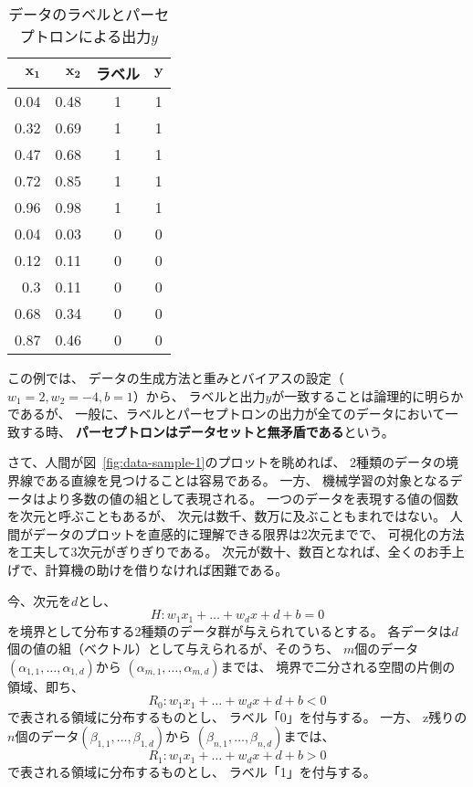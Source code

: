 \begin{table}[htb]
  \centering
  \caption{データのラベルとパーセプトロンによる出力$y$}
  \label{tab:prediction-by-perceptron}
  
  \begin{tabular}{rrcc}
    \toprule
    $\boldsymbol{x_1}$ & $\boldsymbol{x_2}$ & \bf ラベル & $\boldsymbol y$ \\\midrule
    0.04 & 0.48 & 1 & 1\\
    0.32 & 0.69 & 1 & 1\\
    0.47 & 0.68 & 1 & 1\\
    0.72 & 0.85 & 1 & 1\\
    0.96 & 0.98 & 1 & 1\\
    0.04 & 0.03 & 0 & 0\\
    0.12 & 0.11 & 0 & 0\\
    0.3 & 0.11 & 0 & 0\\
    0.68 & 0.34 & 0 & 0\\
    0.87 & 0.46 & 0 & 0\\
    \bottomrule
  \end{tabular}
\end{table}

この例では、
データの生成方法と重みとバイアスの設定（$w_1 = 2, w_2 = -4, b = 1$）から、
ラベルと出力$y$が一致することは論理的に明らかであるが、
一般に、ラベルとパーセプトロンの出力が全てのデータにおいて一致する時、
\textbf{パーセプトロンはデータセットと無矛盾である}という。

さて、人間が図~\ref{fig:data-sample-1}のプロットを眺めれば、
2種類のデータの境界線である直線を見つけることは容易である。
一方、
機械学習の対象となるデータはより多数の値の組として表現される。
一つのデータを表現する値の個数を次元と呼ぶこともあるが、
次元は数千、数万に及ぶこともまれではない。
人間がデータのプロットを直感的に理解できる限界は2次元までで、
可視化の方法を工夫して3次元がぎりぎりである。
次元が数十、数百となれば、全くのお手上げで、計算機の助けを借りなければ困難である。

今、次元を$d$とし、
\[
  H: w_1x_1 + \dots + w_dx+d + b = 0
\]
を境界として分布する2種類のデータ群が与えられているとする。
各データは$d$個の値の組（ベクトル）として与えられるが、そのうち、
$m$個のデータ$(\alpha_{1,1}, \dots, \alpha_{1, d})$から
$(\alpha_{m,1}, \dots, \alpha_{m, d})$までは、
境界で二分される空間の片側の領域、即ち、
\[
  R_0: w_1x_1 + \dots + w_dx+d + b < 0
\]
で表される領域に分布するものとし、
ラベル「0」を付与する。
一方、
z残りの$n$個のデータ$(\beta_{1,1}, \dots, \beta_{1, d})$から
$(\beta_{n,1}, \dots, \beta_{n, d})$までは、
\[
  R_1: w_1x_1 + \dots + w_dx+d + b > 0
\]
で表される領域に分布するものとし、
ラベル「1」を付与する。

